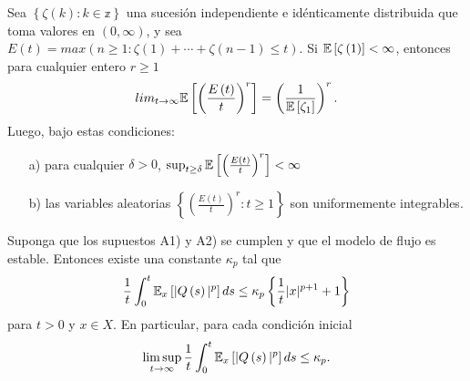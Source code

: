 \begin{Lemma}\label{Lema.5.2.DaiSean}
 Sea $\left\{\zeta\left(k\right):k\in \mathbb{z}\right\}$ una sucesi\'on independiente e id\'enticamente distribuida que toma valores en $\left(0,\infty\right)$,
y sea
$E\left(t\right)=max\left(n\geq1:\zeta\left(1\right)+\cdots+\zeta\left(n-1\right)\leq
t\right)$. Si $\mathbb{E}\left[\zeta\left(1\right)\right]<\infty$,
entonces para cualquier entero $r\geq1$
\begin{equation}
 lim_{t\rightarrow\infty}\mathbb{E}\left[\left(\frac{E\left(t\right)}{t}\right)^{r}\right]=\left(\frac{1}{\mathbb{E}\left[\zeta_{1}\right]}\right)^{r}.
\end{equation}
Luego, bajo estas condiciones:
\begin{itemize}
 \item[a)] para cualquier $\delta>0$, $\sup_{t\geq\delta}\mathbb{E}\left[\left(\frac{E\left(t\right)}{t}\right)^{r}\right]<\infty$
\item[b)] las variables aleatorias
$\left\{\left(\frac{E\left(t\right)}{t}\right)^{r}:t\geq1\right\}$
son uniformemente integrables.
\end{itemize}
\end{Lemma}

\begin{Teo}\label{Tma.5.5.DaiSean}
Suponga que los supuestos A1) y A2) se cumplen y que el modelo de
flujo es estable. Entonces existe una constante $\kappa_{p}$ tal
que
\begin{equation}
\frac{1}{t}\int_{0}^{t}\mathbb{E}_{x}\left[|Q\left(s\right)|^{p}\right]ds\leq\kappa_{p}\left\{\frac{1}{t}|x|^{p+1}+1\right\}
\end{equation}
para $t>0$ y $x\in X$. En particular, para cada condici\'on
inicial
\begin{eqnarray*}
\limsup_{t\rightarrow\infty}\frac{1}{t}\int_{0}^{t}\mathbb{E}_{x}\left[|Q\left(s\right)|^{p}\right]ds\leq\kappa_{p}.
\end{eqnarray*}
\end{Teo}

